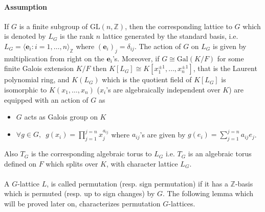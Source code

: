 \documentclass{article}
\theoremstyle{plain}
\theoremstyle{definition}
\newcommand{\Z}{\ensuremath{\mathbb{Z}}}
\begin{document}
\paragraph{Assumption}\label{Assumption}
If $G$ is a finite subgroup of $\mathrm{GL}(n,\Z)$, then the corresponding lattice to $G$ which is denoted by $L_G$ is the rank $n$ lattice generated by the standard basis, i.e. $L_G = \langle \textbf{e}_i : i  = 1, \ldots, n \rangle_\Z$ where $(\textbf{e}_i)_j = \delta_{ij}$. The action of $G$ on $L_G$ is given by multiplication from right on the $\textbf{e}_i$'s. Moreover, if $G \cong \mathrm{Gal}(K/F)$ for some finite Galois extension $K/F$ then $K[L_G] \cong K[x^{\pm 1}_1, \ldots , x^{\pm 1}_n]$, that is the Laurent polynomial ring, and $K(L_G)$ which is the quotient field of $K[L_G]$ is isomorphic to $K(x_1, \ldots , x_n)$ ($x_i$'s are algebraically independent over $K$) are equipped with an action of $G$ as
\begin{itemize}
\item $G$ acts as Galois group on $K$ 
\item $\forall g \in G, \,\,\, g(x_i) = \prod_{j=1}^{j=n} x_j^{a_{ij}}$  where $a_{ij}$'s are given by $g(e_i) = \sum_{j=1}^{j=n} a_{ij}e_j$.
\end{itemize}
Also $T_G$ is the corresponding algebraic torus to $L_G$ i.e. $T_G$ is an algebraic torus defined on $F$ which splits over $K$, with character lattice $L_G$. 
\\
\\
A $G$-lattice $L$, is called permutation (resp. sign permutation) if it has a $\Z$-basis which is permuted (resp. up to sign changes) by $G$. The following lemma which will be proved later on, characterizes permutation $G$-lattices. 
\end{document}
